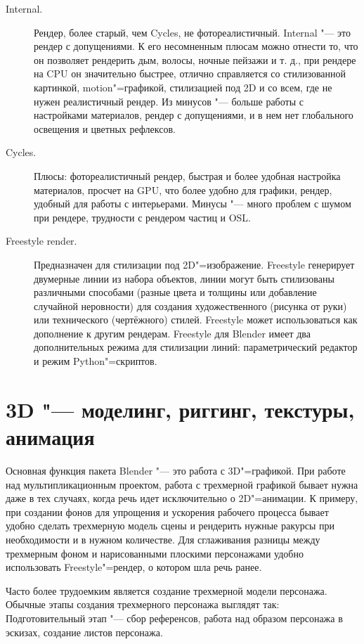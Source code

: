 \documentclass[10pt, a5paper]{article}
\begin{document}
\begin{description}
  \item[Internal.] Рендер, более старый, чем Cycles, не фотореалистичный. Internal "--- это рендер с допущениями. К его несомненным плюсам можно отнести то, что он позволяет рендерить дым, волосы, ночные пейзажи и т. д., при рендере на CPU он значительно быстрее, отлично справляется со стилизованной картинкой, motion"=графикой, стилизацией под 2D и со всем, где не нужен реалистичный рендер. Из минусов "--- больше работы с настройками материалов, рендер с допущениями, и в нем нет глобального освещения и цветных рефлексов.
  \item[Cycles.] Плюсы: фотореалистичный рендер, быстрая и более удобная настройка материалов, просчет на GPU, что более удобно для графики, рендер, удобный для работы с интерьерами. Минусы "--- много проблем с шумом при рендере, трудности с рендером частиц и OSL.
  \item[Freestyle render.] Предназначен для стилизации под 2D"=изображение. 
Freestyle генерирует двумерные линии из набора объектов, линии могут быть стилизованы различными способами (разные цвета и толщины или добавление случайной неровности) для создания художественного (рисунка от руки) или технического (чертёжного) стилей. 
Freestyle может использоваться как дополнение к другим рендерам.
Freestyle для Blender имеет два дополнительных режима для стилизации линий: параметрический редактор и режим Python"=скриптов.
\end{description}

\section*{3D "--- моделинг, риггинг, текстуры, анимация}

Основная функция пакета Blender "--- это работа с 3D"=графикой. При работе над мультипликационным проектом, работа с трехмерной графикой бывает нужна даже в тех случаях, когда речь идет исключительно о 2D"=анимации. К примеру, при создании фонов для упрощения и ускорения рабочего процесса бывает удобно сделать трехмерную модель сцены и рендерить нужные ракурсы при необходимости и в нужном количестве. Для сглаживания разницы между трехмерным фоном и нарисованными плоскими персонажами удобно использовать Freestyle"=рендер, о котором шла речь ранее.

Часто более трудоемким является создание трехмерной модели персонажа. 
Обычные этапы создания трехмерного персонажа выглядят так: 
Подготовительный этап "--- сбор референсов, работа над образом персонажа в эскизах, создание листов персонажа.
\end{document}
